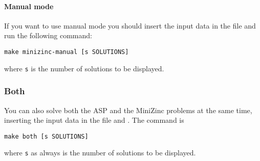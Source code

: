 \paragraph{Manual mode}

If you want to use manual mode you should insert the input data in the file  and run the following command:
\begin{verbatim}
make minizinc-manual [s SOLUTIONS]
\end{verbatim}
where \texttt{s} is the number of solutions to be displayed.

\subsubsection{Both}
You can also solve both the ASP and the MiniZinc problems at the same time, inserting the input data in the file  and . The command is
\begin{verbatim}
make both [s SOLUTIONS]
\end{verbatim}
where \texttt{s} as always is the number of solutions to be displayed.